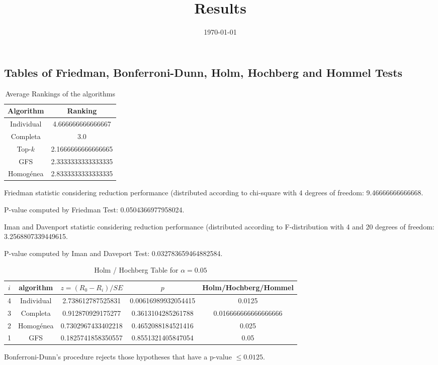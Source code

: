 \documentclass[a4paper,10pt]{article}
\title{Results}
\author{}
\date{\today}
\begin{document}
\begin{landscape}
\oddsidemargin 0in \topmargin 0in\maketitle
\section{Tables of Friedman, Bonferroni-Dunn, Holm, Hochberg and Hommel Tests}
\begin{table}[!htp]
\centering
\caption{Average Rankings of the algorithms
}\begin{tabular}{c|c}
Algorithm&Ranking\\
\hline
Individual&4.666666666666667\\
Completa&3.0\\
Top-$k$&2.1666666666666665\\
GFS&2.3333333333333335\\
Homogénea&2.8333333333333335\\
\end{tabular}
\end{table}


Friedman statistic considering reduction performance (distributed according to chi-square with 4 degrees of freedom: 9.46666666666668.


P-value computed by Friedman Test: 0.0504366977958024.\newline

Iman and Davenport statistic considering reduction performance (distributed according to F-distribution with 4 and 20 degrees of freedom: 3.2568807339449615.


P-value computed by Iman and Daveport Test: 0.032783659464882584.\newline

\begin{table}[!htp]
\centering\tiny
\caption{Holm / Hochberg Table for $\alpha=0.05$}
\begin{tabular}{ccccc}
$i$&algorithm&$z=(R_0 - R_i)/SE$&$p$&Holm/Hochberg/Hommel\\
\hline
4&Individual&2.738612787525831&0.00616989932054415&0.0125\\
3&Completa&0.912870929175277&0.3613104285261788&0.016666666666666666\\
2&Homogénea&0.7302967433402218&0.4652088184521416&0.025\\
1&GFS&0.1825741858350557&0.8551321405847054&0.05\\
\hline
\end{tabular}
\end{table}
Bonferroni-Dunn's procedure rejects those hypotheses that have a p-value $\le0.0125$.



\end{landscape}
\end{document}
